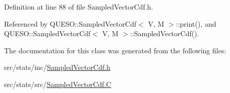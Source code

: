 Definition at line 88 of file Sampled\-Vector\-Cdf.\-h.



Referenced by Q\-U\-E\-S\-O\-::\-Sampled\-Vector\-Cdf$<$ V, M $>$\-::print(), and Q\-U\-E\-S\-O\-::\-Sampled\-Vector\-Cdf$<$ V, M $>$\-::\-Sampled\-Vector\-Cdf().



The documentation for this class was generated from the following files\-:\begin{DoxyCompactItemize}
\item 
src/stats/inc/\hyperlink{_sampled_vector_cdf_8h}{Sampled\-Vector\-Cdf.\-h}\item 
src/stats/src/\hyperlink{_sampled_vector_cdf_8_c}{Sampled\-Vector\-Cdf.\-C}\end{DoxyCompactItemize}
